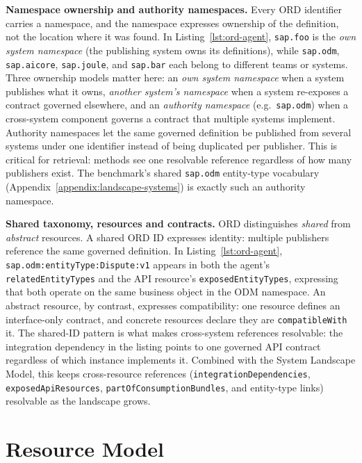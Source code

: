 \textbf{Namespace ownership and authority namespaces.} Every ORD identifier carries a namespace, and the namespace expresses ownership of the definition, not the location where it was found. In Listing~\ref{lst:ord-agent}, \texttt{sap.foo} is the \emph{own system namespace} (the publishing system owns its definitions), while \texttt{sap.odm}, \texttt{sap.aicore}, \texttt{sap.joule}, and \texttt{sap.bar} each belong to different teams or systems. Three ownership models matter here: an \emph{own system namespace} when a system publishes what it owns, \emph{another system's namespace} when a system re-exposes a contract governed elsewhere, and an \emph{authority namespace} (e.g.\ \texttt{sap.odm}) when a cross-system component governs a contract that multiple systems implement. Authority namespaces let the same governed definition be published from several systems under one identifier instead of being duplicated per publisher. This is critical for retrieval: methods see one resolvable reference regardless of how many publishers exist. The benchmark's shared \texttt{sap.odm} entity-type vocabulary (Appendix~\ref{appendix:landscape-systems}) is exactly such an authority namespace.

\textbf{Shared taxonomy, resources and contracts.} ORD distinguishes \emph{shared} from \emph{abstract} resources. A shared ORD ID expresses identity: multiple publishers reference the same governed definition. In Listing~\ref{lst:ord-agent}, \texttt{sap.odm:entityType:Dispute:v1} appears in both the agent's \texttt{relatedEntityTypes} and the API resource's \texttt{exposedEntityTypes}, expressing that both operate on the same business object in the ODM namespace. An abstract resource, by contrast, expresses compatibility: one resource defines an interface-only contract, and concrete resources declare they are \texttt{compatibleWith} it. The shared-ID pattern is what makes cross-system references resolvable: the integration dependency in the listing points to one governed API contract regardless of which instance implements it. Combined with the System Landscape Model, this keeps cross-resource references (\texttt{integrationDependencies}, \texttt{exposedApiResources}, \texttt{partOfConsumptionBundles}, and entity-type links) resolvable as the landscape grows.


\section{Resource Model}
\label{appendix:landscape}

